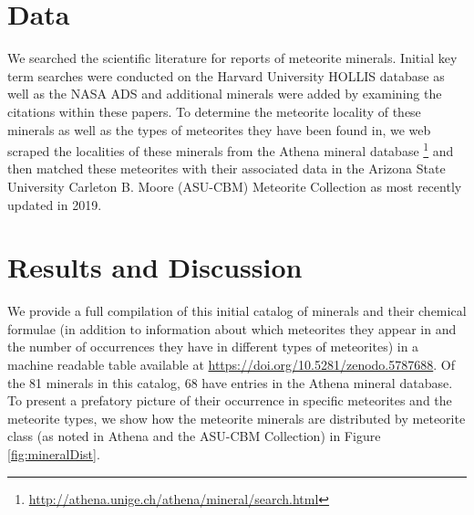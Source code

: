 \documentclass[]{aastex63}
\begin{document}
\section{Data} \label{sec:data}

We searched the scientific literature for reports of meteorite minerals. Initial key term searches were conducted on the Harvard University HOLLIS database as well as the NASA ADS and additional minerals were added by examining the citations within these papers. To determine the meteorite locality of these minerals as well as the types of meteorites they have been found in, we web scraped the localities of these minerals from the Athena mineral database \footnote{\url{http://athena.unige.ch/athena/mineral/search.html}} and then matched these meteorites with their associated data in the Arizona State University Carleton B. Moore (ASU-CBM) Meteorite Collection \citep{asu-cbm} as most recently updated in 2019.

\section{Results and Discussion}


We provide a full compilation of this initial catalog of minerals and their chemical formulae (in addition to information about which meteorites they appear in and the number of occurrences they have in different types of meteorites) in a machine readable table available at \url{https://doi.org/10.5281/zenodo.5787688}. Of the 81 minerals in this catalog, 68 have entries in the Athena mineral database. To present a prefatory picture of their occurrence in specific meteorites and the meteorite types, we show how the meteorite minerals are distributed by meteorite class (as noted in Athena and the ASU-CBM Collection) in Figure \ref{fig:mineralDist}. 
\end{document}
